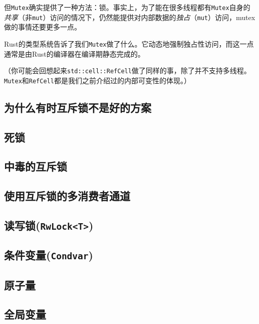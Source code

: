 但\texttt{Mutex}确实提供了一种方法：锁。事实上，为了能在很多线程都有\texttt{Mutex}自身的\emph{共享}（非\texttt{mut}）访问的情况下，仍然能提供对内部数据的\emph{独占}（\texttt{mut}）访问，mutex做的事情还要更多一点。

Rust的类型系统告诉了我们\texttt{Mutex}做了什么。它动态地强制独占性访问，而这一点通常是由Rust的编译器在编译期静态完成的。

（你可能会回想起来\texttt{std::cell::RefCell}做了同样的事，除了并不支持多线程。\texttt{Mutex}和\texttt{RefCell}都是我们之前介绍过的内部可变性的体现。）

\subsection{为什么有时互斥锁不是好的方案}

\subsection{死锁}

\subsection{中毒的互斥锁}

\subsection{使用互斥锁的多消费者通道}

\subsection{读写锁(\texttt{RwLock<T>})}

\subsection{条件变量(\texttt{Condvar})}

\subsection{原子量}\label{atomic}

\subsection{全局变量}\label{globalvar}